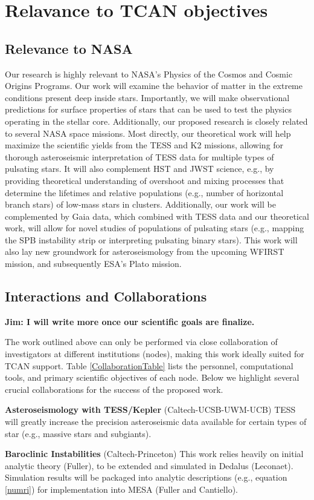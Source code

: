 {\color{orange}
\section{Relavance to TCAN objectives}
}

{\color{orange}
\subsection{Relevance to NASA}
}

Our research is highly relevant to NASA's Physics of the Cosmos and Cosmic Origins Programs. Our work will examine the behavior of matter in the extreme conditions present deep inside stars. Importantly, we will make observational predictions for surface properties of stars that can be used to test the physics operating in the stellar core. Additionally, our proposed research is closely related to several NASA space missions. Most directly, our theoretical work will help maximize the scientific yields from the TESS and K2 missions, allowing for thorough asteroseismic interpretation of TESS data for multiple types of pulsating stars. It will also complement HST and JWST science, e.g., by providing theoretical understanding of overshoot and mixing processes that determine the lifetimes and relative populations (e.g., number of horizontal branch stars) of low-mass stars in clusters. Additionally, our work will be complemented by Gaia data, which combined with TESS data and our theoretical work, will allow for novel studies of populations of pulsating stars (e.g., mapping the SPB instability strip or interpreting pulsating binary stars). This work will also lay new groundwork for asteroseismology from the upcoming WFIRST mission, and subsequently ESA's Plato mission. 

{\color{orange}
\subsection{Interactions and Collaborations}
}

{\bf Jim: I will write more once our scientific goals are finalize.}

The work outlined above can only be performed via close collaboration of investigators at different institutions (nodes), making this work ideally suited for TCAN support. Table \ref{CollaborationTable} lists the personnel, computational tools, and primary scientific objectives of each node. Below we highlight several crucial collaborations for the success of the proposed work.

{\bf Asteroseismology with TESS/Kepler} (Caltech-UCSB-UWM-UCB) TESS will greatly increase the precision asteroseismic data available for certain types of star (e.g., massive stars and subgiants). 

{\bf Baroclinic Instabilities} (Caltech-Princeton) This work relies heavily on initial analytic theory (Fuller), to be extended and simulated in Dedalus (Leconaet). Simulation results will be packaged into analytic descriptions (e.g., equation \ref{numri}) for implementation into MESA (Fuller and Cantiello).

